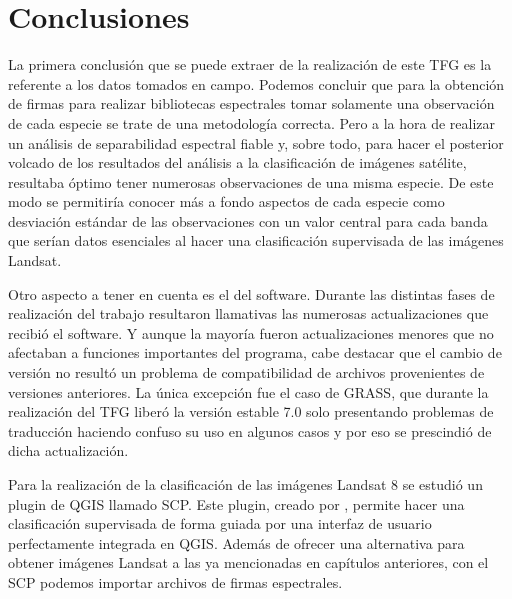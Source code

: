 


\chapter{Conclusiones}

La primera conclusión que se puede extraer de la realización de este \ac{TFG} es la referente a los datos tomados en campo. Podemos concluir que para la obtención de firmas para realizar bibliotecas espectrales tomar solamente una observación de cada especie se trate de una metodología correcta. Pero a la hora de realizar un análisis de separabilidad espectral fiable y, sobre todo, para hacer el posterior volcado de los resultados del análisis a la clasificación de imágenes satélite, resultaba óptimo tener numerosas observaciones de una misma especie. De este modo se permitiría conocer más a fondo aspectos de cada especie como desviación estándar de las observaciones con un valor central para cada banda que serían datos esenciales al hacer una clasificación supervisada de las imágenes Landsat.\Sep

Otro aspecto a tener en cuenta es el del software. Durante las distintas fases de realización del trabajo resultaron llamativas las numerosas actualizaciones que recibió el software. Y aunque la mayoría fueron actualizaciones menores que no afectaban a funciones importantes del programa, cabe destacar que el cambio de versión no resultó un problema de compatibilidad de archivos provenientes de versiones anteriores. La única excepción fue el caso de GRASS, que durante la realización del \ac{TFG} liberó la versión estable 7.0 solo presentando problemas de traducción haciendo confuso su uso en algunos casos y por eso se prescindió de dicha actualización.\Sep

Para la realización de la clasificación de las imágenes Landsat 8 se estudió un plugin de QGIS llamado \ac{SCP}. Este plugin, creado por \cite{Congedo2015}, permite hacer una clasificación supervisada de forma guiada por una interfaz de usuario perfectamente integrada en QGIS. Además de ofrecer una alternativa para obtener imágenes Landsat a las ya mencionadas en capítulos anteriores, con el \ac{SCP} podemos importar archivos de firmas espectrales.\Sep